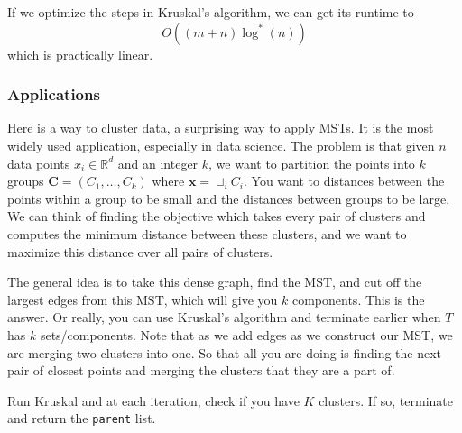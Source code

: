  If we optimize the steps in Kruskal's algorithm, we can get its runtime to 
  \begin{equation}
    O((m + n) \log^{\ast} (n))
  \end{equation}
  which is practically linear. 

\subsubsection{Applications}

  Here is a way to cluster data, a surprising way to apply MSTs. It is the most widely used application, especially in data science. The problem is that given $n$ data points $x_i \in \mathbb{R}^d$ and an integer $k$, we want to partition the points into $k$ groups $\mathbf{C} = (C_1, \ldots, C_k)$ where $\mathbf{x} = \sqcup_i C_i$. You want to distances between the points within a group to be small and the distances between groups to be large. We can think of finding the objective which takes every pair of clusters and computes the minimum distance between these clusters, and we want to maximize this distance over all pairs of clusters.  

  \begin{algo}
    The general idea is to take this dense graph, find the MST, and cut off the largest edges from this MST, which will give you $k$ components. This is the answer. Or really, you can use Kruskal's algorithm and terminate earlier when $T$ has $k$ sets/components. 
    Note that as we add edges as we construct our MST, we are merging two clusters into one. So that all you are doing is finding the next pair of closest points and merging the clusters that they are a part of. 

    \begin{algorithm}[H]
      \label{alg:clustering}
      \begin{algorithmic}[1]
          \State Run Kruskal and at each iteration, check if you have $K$ clusters. 
          \State If so, terminate and return the \texttt{parent} list. 
        \EndFunction
      \end{algorithmic}
    \end{algorithm}
  \end{algo}

